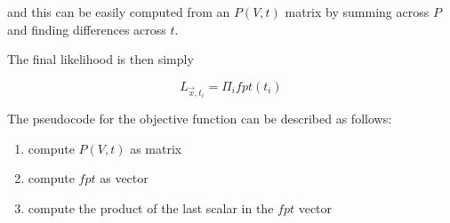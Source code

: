 \documentclass[10pt]{article}
\begin{document}
and this can be easily computed from an $P(V,t)$ matrix by summing
across $P$ and finding differences across $t$.

The final likelihood is then simply

\begin{equation}
    L_{\vec{x},t_{i}} = \Pi_{i} fpt(t_{i})
\end{equation}

{  }

The pseudocode for the objective function can be described as follows:

\begin{enumerate}
        for each spike interval
    \item compute $P(V,t)$ as matrix
    \item compute $fpt$ as vector
    \item compute the product of the last scalar in the $fpt$ vector
\end{enumerate}
\end{document}
